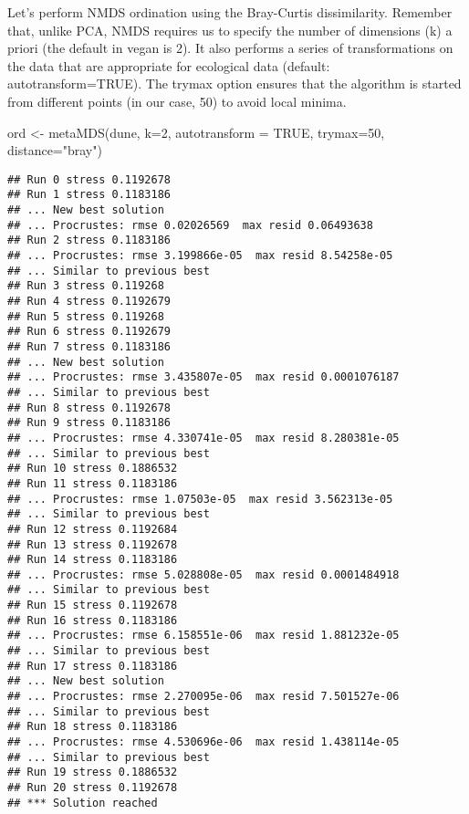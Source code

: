 \documentclass[
]{book}
\newenvironment{Shaded}{\begin{snugshade}}{\end{snugshade}}
\newcommand{\AttributeTok}[1]{\textcolor[rgb]{0.77,0.63,0.00}{#1}}
\newcommand{\ConstantTok}[1]{\textcolor[rgb]{0.00,0.00,0.00}{#1}}
\newcommand{\DecValTok}[1]{\textcolor[rgb]{0.00,0.00,0.81}{#1}}
\newcommand{\FunctionTok}[1]{\textcolor[rgb]{0.00,0.00,0.00}{#1}}
\newcommand{\NormalTok}[1]{#1}
\newcommand{\OtherTok}[1]{\textcolor[rgb]{0.56,0.35,0.01}{#1}}
\newcommand{\StringTok}[1]{\textcolor[rgb]{0.31,0.60,0.02}{#1}}
\begin{document}
Let's perform NMDS ordination using the Bray-Curtis dissimilarity. Remember that, unlike PCA, NMDS requires us to specify the number of dimensions (k) a priori (the default in vegan is 2). It also performs a series of transformations on the data that are appropriate for ecological data (default: autotransform=TRUE). The trymax option ensures that the algorithm is started from different points (in our case, 50) to avoid local minima.

\begin{Shaded}
\begin{Highlighting}[]
\NormalTok{ord }\OtherTok{\textless{}{-}} \FunctionTok{metaMDS}\NormalTok{(dune, }\AttributeTok{k=}\DecValTok{2}\NormalTok{, }\AttributeTok{autotransform =} \ConstantTok{TRUE}\NormalTok{, }\AttributeTok{trymax=}\DecValTok{50}\NormalTok{, }\AttributeTok{distance=}\StringTok{"bray"}\NormalTok{)}
\end{Highlighting}
\end{Shaded}

\begin{verbatim}
## Run 0 stress 0.1192678 
## Run 1 stress 0.1183186 
## ... New best solution
## ... Procrustes: rmse 0.02026569  max resid 0.06493638 
## Run 2 stress 0.1183186 
## ... Procrustes: rmse 3.199866e-05  max resid 8.54258e-05 
## ... Similar to previous best
## Run 3 stress 0.119268 
## Run 4 stress 0.1192679 
## Run 5 stress 0.119268 
## Run 6 stress 0.1192679 
## Run 7 stress 0.1183186 
## ... New best solution
## ... Procrustes: rmse 3.435807e-05  max resid 0.0001076187 
## ... Similar to previous best
## Run 8 stress 0.1192678 
## Run 9 stress 0.1183186 
## ... Procrustes: rmse 4.330741e-05  max resid 8.280381e-05 
## ... Similar to previous best
## Run 10 stress 0.1886532 
## Run 11 stress 0.1183186 
## ... Procrustes: rmse 1.07503e-05  max resid 3.562313e-05 
## ... Similar to previous best
## Run 12 stress 0.1192684 
## Run 13 stress 0.1192678 
## Run 14 stress 0.1183186 
## ... Procrustes: rmse 5.028808e-05  max resid 0.0001484918 
## ... Similar to previous best
## Run 15 stress 0.1192678 
## Run 16 stress 0.1183186 
## ... Procrustes: rmse 6.158551e-06  max resid 1.881232e-05 
## ... Similar to previous best
## Run 17 stress 0.1183186 
## ... New best solution
## ... Procrustes: rmse 2.270095e-06  max resid 7.501527e-06 
## ... Similar to previous best
## Run 18 stress 0.1183186 
## ... Procrustes: rmse 4.530696e-06  max resid 1.438114e-05 
## ... Similar to previous best
## Run 19 stress 0.1886532 
## Run 20 stress 0.1192678 
## *** Solution reached
\end{verbatim}
\end{document}

